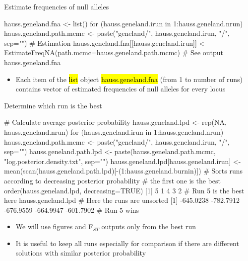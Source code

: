 \documentclass[compress, ucs, xelatex, 11pt, xcolor=svgnames,
  hyperref={
    bookmarks=true,
    unicode=true,
    colorlinks=true,
    pdftitle={Molecular data in R},
    plainpages=false,
    pdfauthor={Vojtech Zeisek},
    pdfsubject={Course about phylogeny and evolution in R},
    pdfcreator={XeLaTeX},
    pdfkeywords={R, evolution, phylogeny, molecular data},
    linkcolor=Tomato,
    anchorcolor=SaddleBrown,
    citecolor=Goldenrod,
    filecolor=DarkMagenta,
    menucolor=Sienna,
    urlcolor=DarkTurquoise,
    pdftex},
  url={hyphens, lowtilde} %
  ]{beamer}
\renewcommand{\texttt}[1]{\hl{\ttfamily #1}}
\begin{document}
\begin{frame}[fragile]{Estimate frequencies of null alleles}
  \begin{spluscode}
    hauss.geneland.fna <- list()
    for (hauss.geneland.irun in 1:hauss.geneland.nrun) {
      hauss.geneland.path.mcmc <- paste("geneland/", hauss.geneland.irun, 
        "/", sep="")
      # Estimation
      hauss.geneland.fna[[hauss.geneland.irun]] <- 
        EstimateFreqNA(path.mcmc=hauss.geneland.path.mcmc)
      }
    # See output
    hauss.geneland.fna
  \end{spluscode}
  \begin{itemize}
    \item Each item of the \texttt{list} object \texttt{hauss.geneland.fna} (from 1 to number of runs) contains vector of estimated frequencies of null alleles for every locus
  \end{itemize}
\end{frame}

\begin{frame}[fragile]{Determine which run is the best}
  \begin{spluscode}
    # Calculate average posterior probability
    hauss.geneland.lpd <- rep(NA, hauss.geneland.nrun)
    for (hauss.geneland.irun in 1:hauss.geneland.nrun) {
      hauss.geneland.path.mcmc <- paste("geneland/",
        hauss.geneland.irun, "/", sep="")
      hauss.geneland.path.lpd <- paste(hauss.geneland.path.mcmc,
        "log.posterior.density.txt", sep="")
      hauss.geneland.lpd[hauss.geneland.irun] <- 
        mean(scan(hauss.geneland.path.lpd)[-(1:hauss.geneland.burnin)]) }
    # Sorts runs according to decreasing posterior probability
    # the first one is the best
    order(hauss.geneland.lpd, decreasing=TRUE)
    [1] 5 1 4 3 2 # Run 5 is the best here
    hauss.geneland.lpd # Here the runs are unsorted
    [1] -645.0238 -782.7912 -676.9559 -664.9947 -601.7902 # Run 5 wins
  \end{spluscode}
  \begin{itemize}
    \item We will use figures and F$_{ST}$ outputs only from the best run
    \item It is useful to keep all runs especially for comparison if there are different solutions with similar posterior probability
  \end{itemize}
\end{frame}
\end{document}
